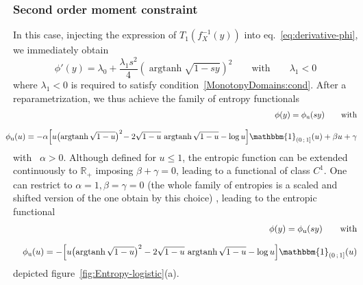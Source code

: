 \documentclass[entropy,article,submit,moreauthors,pdftex]{Definitions/mdpi}
\newcommand{\SZ}[1]{{\color{blue} #1}}                                       %
\def\Rset{\mathbb{R}}%
\def\X{\mathcal{X}}%
\def\un{\mathbbm{1}}%
\def\argtanh{\operatorname{argtanh}}%
\def\u{\mathrm{u}}
\begin{document}

\subsubsection{Second order moment constraint}
\label{subsubsecapp:LogisticSecondOrder}

In this  case, \SZ{injecting the  expression of $T_1\left(  f_X^{-1}(y) \right)$
  into   eq.~\eqref{eq:derivative-phi},   we   immediately   obtain
%
\[
\phi'(y) = \lambda_0 + \frac{\lambda_1 s^2}{4} \left( \argtanh\sqrt{1 - s y} \right)^2
\qquad \mbox{with} \qquad \lambda_1 < 0
\]
%
where      $\lambda_1      <      0$       is      required      to      satisfy
condition~\ref{MonotonyDomains:cond}.
%
After a  reparametrization, we  thus achieve the  family of  entropy functionals
%
\begin{eqnarray*}
  &&\hspace{-7mm}\phi(y) = \phi_\u(s y) \qquad \mbox{with}
 \\[2.5mm]  
&&\hspace{-7mm}\phi_\u(u)  =   -\alpha  \left[   u  \left(
  \argtanh\sqrt{1-u}  \right)^2 \!  -  2  \sqrt{1-u} \, \argtanh\sqrt{1-u}  -  \log  u
  \right] \un_{\left( 0 \, ; \, 1 \right]}(u) + \beta u + \gamma
\end{eqnarray*}
%
with \ $\alpha >  0$. Although defined for $u \le 1$,  the entropic function can
be extended continuously to $\Rset_+$ imposing  $\beta + \gamma = 0$, leading to
a functional of class  $C^1$. One can restrict to $\alpha = 1,  \beta = \gamma =
0$ (the  whole family of entropies  is a scaled  and shifted version of  the one
obtain by this choice) , leading to the entropic functional
%
\begin{eqnarray*}
  &&\phi(y) = \phi_\u(s y) \qquad \mbox{with}
 \\[2.5mm]  
&& \phi_\u(u)  =  - \left[  u  \left(  \argtanh\sqrt{1-u} \right)^2  -  2
  \sqrt{1-u}  \, \argtanh\sqrt{1-u} -  \log  u  \right] \un_{\left(  0  \,  ; \,  1
  \right]}(u)
\end{eqnarray*}
%
depicted figure~\ref{fig:Entropy-logistic}(a).
}
\end{document}
